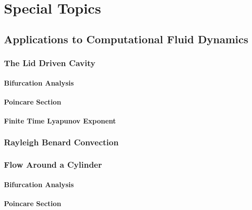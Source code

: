 \documentclass{amsbook}
\begin{document}
\chapter{Special Topics}

\section{Applications to Computational Fluid Dynamics}

\subsection{The Lid Driven Cavity}
\subsubsection{Bifurcation Analysis}
\subsubsection{Poincare Section}
\subsubsection{Finite Time Lyapunov Exponent}

\subsection{Rayleigh Benard Convection}

\subsection{Flow Around a Cylinder}
\subsubsection{Bifurcation Analysis}
\subsubsection{Poincare Section}
\end{document}
